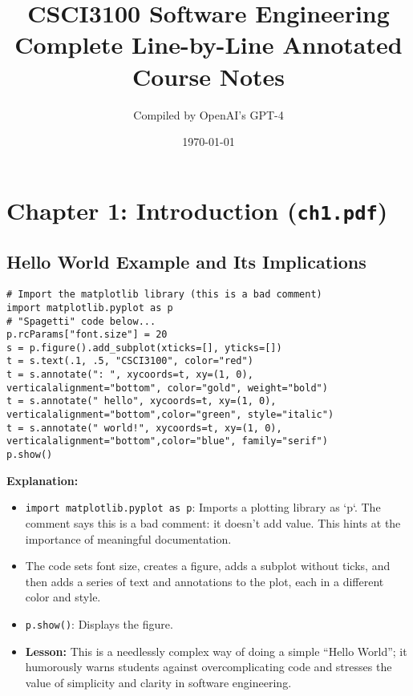 \documentclass[11pt,a4paper]{article}
\title{CSCI3100 Software Engineering\\
\large Complete Line-by-Line Annotated Course Notes}
\author{Compiled by OpenAI's GPT-4}
\date{\today}
\begin{document}
\maketitle
\tableofcontents
\newpage

\section{Chapter 1: Introduction (\texttt{ch1.pdf})}

\subsection*{Hello World Example and Its Implications}
\begin{tcolorbox}[title=Code Example: Using matplotlib to say Hello World]
\begin{verbatim}
# Import the matplotlib library (this is a bad comment)
import matplotlib.pyplot as p
# "Spagetti" code below...
p.rcParams["font.size"] = 20
s = p.figure().add_subplot(xticks=[], yticks=[])
t = s.text(.1, .5, "CSCI3100", color="red")
t = s.annotate(": ", xycoords=t, xy=(1, 0), verticalalignment="bottom", color="gold", weight="bold")
t = s.annotate(" hello", xycoords=t, xy=(1, 0), verticalalignment="bottom",color="green", style="italic")
t = s.annotate(" world!", xycoords=t, xy=(1, 0), verticalalignment="bottom",color="blue", family="serif")
p.show()
\end{verbatim}
\end{tcolorbox}

\textbf{Explanation:}
\begin{itemize}
    \item \texttt{import matplotlib.pyplot as p}: Imports a plotting library as `p`. The comment says this is a bad comment: it doesn't add value. This hints at the importance of meaningful documentation.
    \item The code sets font size, creates a figure, adds a subplot without ticks, and then adds a series of text and annotations to the plot, each in a different color and style.
    \item \texttt{p.show()}: Displays the figure.
    \item \textbf{Lesson:} This is a needlessly complex way of doing a simple ``Hello World''; it humorously warns students against overcomplicating code and stresses the value of simplicity and clarity in software engineering.
\end{itemize}
\end{document}
